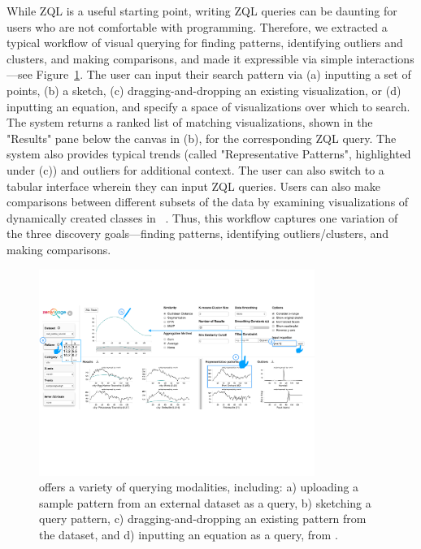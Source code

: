 \par While ZQL is a useful starting point, writing ZQL
queries can be daunting for users who are not comfortable
with programming.
Therefore, we extracted a typical workflow
of visual querying for finding patterns, identifying
outliers and clusters, and making comparisons, and made it expressible
via simple interactions---see Figure~\ref{fig:modalities}.
The user can input their search pattern via (a) inputting a set of points,
(b) a sketch, (c) dragging-and-dropping an existing visualization,
or (d) inputting an equation, 
and specify a space of visualizations over which to search.
The system returns a ranked list of matching visualizations, shown in the "Results" pane below the canvas in (b), for the corresponding ZQL query.
The system also provides typical trends 
(called "Representative Patterns", highlighted under (c)) and outliers
for additional context. 
The user can also switch to a tabular interface wherein
they can input ZQL queries.  
Users can also make comparisons between different 
subsets of the data by examining visualizations 
of dynamically created classes in \zv~\cite{Lee2017}.
Thus, this workflow captures one variation of the three
discovery goals---finding patterns, identifying outliers/clusters,
and making comparisons. 
\begin{figure}[h!]
\centering
\vspace{-10pt}
\includegraphics[width=0.8\textwidth]{figures/modalities.pdf}
\caption{\zv offers a variety of querying modalities, including: a) uploading a sample pattern from an external dataset as a query, b) sketching a query pattern, c) dragging-and-dropping an existing pattern from the dataset, and d) inputting an equation as a query, from \cite{Lee2017}.}
\label{fig:modalities}
\vspace{-10pt}
\end{figure}


